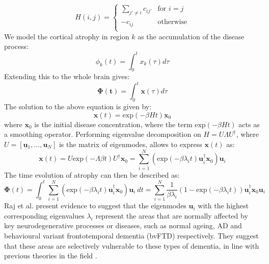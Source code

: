\begin{equation}
\label{eq:raj3}
 H(i,j) = \begin{cases} 
 \sum_{j' \neq i} c_{ij'} & \mbox{for } i = j \\ 
 -c_{ij} & \mbox{otherwise} \\ 
\end{cases} 
\end{equation}
We model the cortical atrophy in region $k$ as the accumulation of the disease process:
\begin{equation}
\label{eq:raj4}
 \phi_k(t) = \int_0^t x_k(\tau)d\tau
\end{equation}
Extending this to the whole brain gives:
\begin{equation}
 \boldsymbol{\Phi(t)} = \int_0^t \textbf{x}(\tau)d\tau
\end{equation}
The solution to the above equation is given by:
\begin{equation}
 \textbf{x}(t) = \text{exp}(-\beta H t) \textbf{x}_0
\end{equation}
where $\textbf{x}_0$ is the initial disease concentration, where the term $\text{exp}(-\beta H t)$ acts as a smoothing operator. Performing eigenvalue decomposition on $H = U\Lambda U^{\dagger}$, where $U = [\textbf{u}_1,\dots,\textbf{u}_N]$ is the matrix of eigenmodes, allows to express $\textbf{x}(t)$ as:
\begin{equation}
 \textbf{x}(t) = U \text{exp}(-\Lambda \beta t) U^{\dagger} \textbf{x}_0 = \sum_{i=1}^N \left( \text{exp}(-\beta \lambda_i t) \textbf{u}_i^{\dagger} \textbf{x}_0 \right) \textbf{u}_i
\end{equation}
The time evolution of atrophy can then be described as:
\begin{equation} 
 \boldsymbol{\Phi}(t) = \int_0^t \sum_{i=1}^N \left( \text{exp}(-\beta \lambda_i t) \textbf{u}_i^{\dagger} \textbf{x}_0 \right) \textbf{u}_i\ dt = \sum_{i=1}^N \frac{1}{\beta \lambda_i} \left( 1-\text{exp}(-\beta \lambda_i t)\right) \textbf{u}_i^{\dagger} \textbf{x}_0 \textbf{u}_i 
\end{equation}
Raj et al. \cite{raj2012network} present evidence to suggest that the eigenmodes $\textbf{u}_i$ with the highest corresponding eigenvalues $\lambda_i$ represent the areas that are normally affected by key neurodegenerative processes or diseases, such as normal ageing, AD and behavioural variant frontotemporal dementia (bvFTD) respectively. They suggest that these areas are selectively vulnerable to these types of dementia, in line with previous theories in the field \cite{seeley2009neurodegenerative, zhou2010divergent, zhou2012predicting}. 

